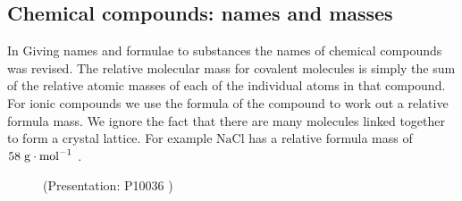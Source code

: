             \subsection{ Chemical compounds: names and masses}
            \nopagebreak
\label{m38689*uid97124}In Giving names and formulae to substances the names of chemical compounds was revised. The relative molecular mass for covalent molecules is simply the sum of the relative atomic masses of each of the individual atoms in that compound. For ionic compounds we use the formula of the compound to work out a relative formula mass. We ignore the fact that there are many molecules linked together to form a crystal lattice. For example $\mathrm{NaCl}$ has a relative formula mass of $58\phantom{\rule{3pt}{0ex}}\mathrm{g}\ensuremath{\cdot}{\mathrm{mol}}^{-1}$ .  
    \label{m38689*eip-891}
    \setcounter{subfigure}{0}
	\begin{figure}[H] %
    \label{m38689*slidesharemedia}\label{m38689*slideshareflash} { (Presentation:  P10036 )}
      \vspace{2pt}
    \vspace{.1in}
 \end{figure}       \par \label{m38689*cid13}
